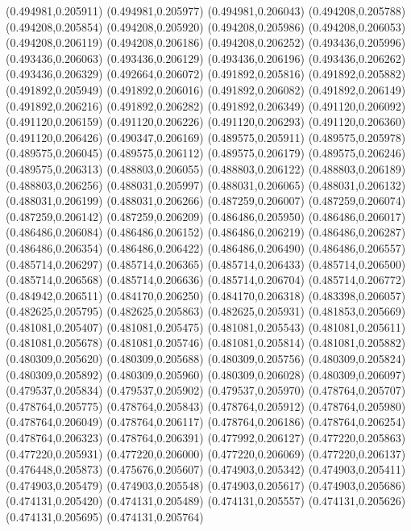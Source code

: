 (0.494981,0.205911)
(0.494981,0.205977)
(0.494981,0.206043)
(0.494208,0.205788)
(0.494208,0.205854)
(0.494208,0.205920)
(0.494208,0.205986)
(0.494208,0.206053)
(0.494208,0.206119)
(0.494208,0.206186)
(0.494208,0.206252)
(0.493436,0.205996)
(0.493436,0.206063)
(0.493436,0.206129)
(0.493436,0.206196)
(0.493436,0.206262)
(0.493436,0.206329)
(0.492664,0.206072)
(0.491892,0.205816)
(0.491892,0.205882)
(0.491892,0.205949)
(0.491892,0.206016)
(0.491892,0.206082)
(0.491892,0.206149)
(0.491892,0.206216)
(0.491892,0.206282)
(0.491892,0.206349)
(0.491120,0.206092)
(0.491120,0.206159)
(0.491120,0.206226)
(0.491120,0.206293)
(0.491120,0.206360)
(0.491120,0.206426)
(0.490347,0.206169)
(0.489575,0.205911)
(0.489575,0.205978)
(0.489575,0.206045)
(0.489575,0.206112)
(0.489575,0.206179)
(0.489575,0.206246)
(0.489575,0.206313)
(0.488803,0.206055)
(0.488803,0.206122)
(0.488803,0.206189)
(0.488803,0.206256)
(0.488031,0.205997)
(0.488031,0.206065)
(0.488031,0.206132)
(0.488031,0.206199)
(0.488031,0.206266)
(0.487259,0.206007)
(0.487259,0.206074)
(0.487259,0.206142)
(0.487259,0.206209)
(0.486486,0.205950)
(0.486486,0.206017)
(0.486486,0.206084)
(0.486486,0.206152)
(0.486486,0.206219)
(0.486486,0.206287)
(0.486486,0.206354)
(0.486486,0.206422)
(0.486486,0.206490)
(0.486486,0.206557)
(0.485714,0.206297)
(0.485714,0.206365)
(0.485714,0.206433)
(0.485714,0.206500)
(0.485714,0.206568)
(0.485714,0.206636)
(0.485714,0.206704)
(0.485714,0.206772)
(0.484942,0.206511)
(0.484170,0.206250)
(0.484170,0.206318)
(0.483398,0.206057)
(0.482625,0.205795)
(0.482625,0.205863)
(0.482625,0.205931)
(0.481853,0.205669)
(0.481081,0.205407)
(0.481081,0.205475)
(0.481081,0.205543)
(0.481081,0.205611)
(0.481081,0.205678)
(0.481081,0.205746)
(0.481081,0.205814)
(0.481081,0.205882)
(0.480309,0.205620)
(0.480309,0.205688)
(0.480309,0.205756)
(0.480309,0.205824)
(0.480309,0.205892)
(0.480309,0.205960)
(0.480309,0.206028)
(0.480309,0.206097)
(0.479537,0.205834)
(0.479537,0.205902)
(0.479537,0.205970)
(0.478764,0.205707)
(0.478764,0.205775)
(0.478764,0.205843)
(0.478764,0.205912)
(0.478764,0.205980)
(0.478764,0.206049)
(0.478764,0.206117)
(0.478764,0.206186)
(0.478764,0.206254)
(0.478764,0.206323)
(0.478764,0.206391)
(0.477992,0.206127)
(0.477220,0.205863)
(0.477220,0.205931)
(0.477220,0.206000)
(0.477220,0.206069)
(0.477220,0.206137)
(0.476448,0.205873)
(0.475676,0.205607)
(0.474903,0.205342)
(0.474903,0.205411)
(0.474903,0.205479)
(0.474903,0.205548)
(0.474903,0.205617)
(0.474903,0.205686)
(0.474131,0.205420)
(0.474131,0.205489)
(0.474131,0.205557)
(0.474131,0.205626)
(0.474131,0.205695)
(0.474131,0.205764)
